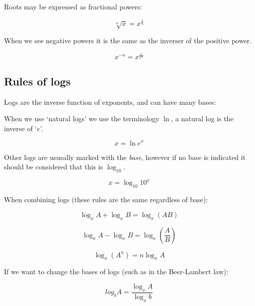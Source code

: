 \documentclass[
]{book}
\begin{document}
Roots may be expressed as fractional powers:

\begin{equation}
\sqrt[n]{x}=x^{\frac{1}{n}}
\label{eq:fracpower}
\end{equation}

When we see negative powers it is the same as the inverser of the positive power.

\begin{equation}
x^{-n}=x^{\frac{1}{x^n}}
\label{eq:negpower}
\end{equation}

\hypertarget{sec:rulelog}{%
\subsection{Rules of logs}\label{sec:rulelog}}

Logs are the inverse function of exponents, and can have many bases:

When we use `natural logs' we use the terminology \(\ln\), a natural log is the inverse of `\(e\)'.

\begin{equation}
x = \ln e^x
\label{eq:natlog}
\end{equation}

Other logs are ususally marked with the \emph{base}, however if no base is indicated it should be considered that this is \(\log_{10}\).

\begin{equation}
x = \log_{10} 10^x
\label{eq:10log}
\end{equation}

When combining logs (these rules are the same regardless of base):

\begin{equation}
\log_x A + \log_x B = \log_x (AB)
\label{eq:logadd}
\end{equation}

\begin{equation}
\log_x A  - \log_x B = \log_x \left(\frac{A}{B}\right)
\label{eq:logsub}
\end{equation}

\begin{equation}
\log_x (A^n)= n \log_x A
\label{eq:logpower}
\end{equation}

If we want to change the bases of logs (such as in the Beer-Lambert law):

\begin{equation}
log_b A = \frac{\log_x A}{\log_x b}
\label{eq:convpower}
\end{equation}
\end{document}
